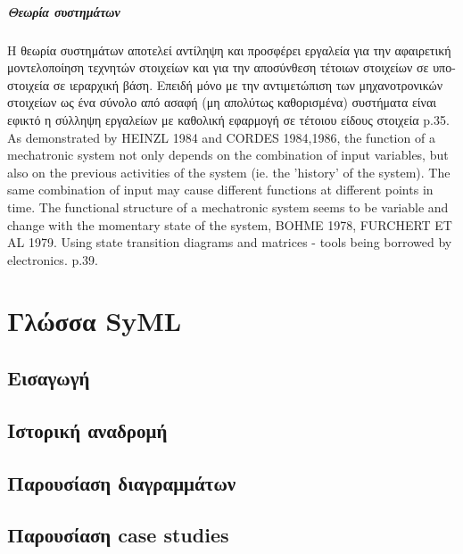 \documentclass[a4paper,12pt,twoside]{report}
\begin{document}
{		\paragraph{Θεωρία συστημάτων}{Η θεωρία συστημάτων αποτελεί αντίληψη και προσφέρει εργαλεία για την αφαιρετική μοντελοποίηση τεχνητών στοιχείων και για την αποσύνθεση τέτοιων στοιχείων σε υπο-στοιχεία σε ιεραρχική βάση. Επειδή μόνο με την αντιμετώπιση των μηχανοτρονικών στοιχείων ως ένα σύνολο από ασαφή (μη απολύτως καθορισμένα) συστήματα είναι εφικτό η σύλληψη εργαλείων με καθολική εφαρμογή σε τέτοιου είδους στοιχεία \cite{ATheoreticalApproachOnMechatronicsDesign:Buur1990} p.35.
		\linebreak
		As demonstrated by HEINZL 1984 and CORDES 1984,1986, the function of a mechatronic system not only depends on the combination of input variables, but also on the previous activities of the system (ie. the 'history' of the system). The same combination of input may cause different functions at different points in time. The functional structure of a mechatronic system seems to be variable and change with the momentary state of the system, BOHME 1978, FURCHERT ET AL 1979. Using state transition diagrams and matrices - tools being borrowed by electronics. \cite{ATheoreticalApproachOnMechatronicsDesign:Buur1990} p.39.
		}



	\chapter{Γλώσσα SyML}
		\label{κεφ.:Γλώσσα SyML}
		
		\section{Εισαγωγή}
		\section{Ιστορική αναδρομή}
		\section{Παρουσίαση διαγραμμάτων}
		\section{Παρουσίαση case studies}


}
\end{document}
